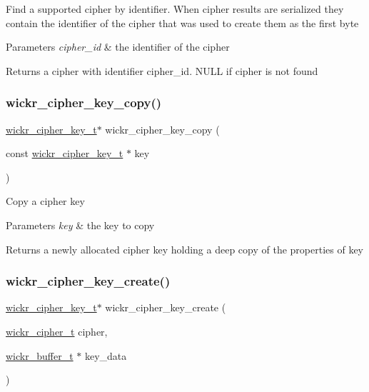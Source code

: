 Find a supported cipher by identifier. When cipher results are serialized they contain the identifier of the cipher that was used to create them as the first byte


\begin{DoxyParams}{Parameters}
{\em cipher\+\_\+id} & the identifier of the cipher \\
\hline
\end{DoxyParams}
\begin{DoxyReturn}{Returns}
a cipher with identifier \textquotesingle{}cipher\+\_\+id\textquotesingle{}. N\+U\+LL if cipher is not found 
\end{DoxyReturn}
\mbox{\label{group__wickr__cipher_gaa473bc83f82d6353aa6f4cb4e36bf4f0}} 
\subsubsection{\texorpdfstring{wickr\_cipher\_key\_copy()}{wickr\_cipher\_key\_copy()}}
{\footnotesize\ttfamily \mbox{\hyperlink{structwickr__cipher__key}{wickr\+\_\+cipher\+\_\+key\+\_\+t}}$\ast$ wickr\+\_\+cipher\+\_\+key\+\_\+copy (\begin{DoxyParamCaption}\item[{const \mbox{\hyperlink{structwickr__cipher__key}{wickr\+\_\+cipher\+\_\+key\+\_\+t}} $\ast$}]{key }\end{DoxyParamCaption})}

Copy a cipher key


\begin{DoxyParams}{Parameters}
{\em key} & the key to copy \\
\hline
\end{DoxyParams}
\begin{DoxyReturn}{Returns}
a newly allocated cipher key holding a deep copy of the properties of \textquotesingle{}key\textquotesingle{} 
\end{DoxyReturn}
\mbox{\label{group__wickr__cipher_ga73e2a916ba0ff19517e30a65a68390f0}} 
\subsubsection{\texorpdfstring{wickr\_cipher\_key\_create()}{wickr\_cipher\_key\_create()}}
{\footnotesize\ttfamily \mbox{\hyperlink{structwickr__cipher__key}{wickr\+\_\+cipher\+\_\+key\+\_\+t}}$\ast$ wickr\+\_\+cipher\+\_\+key\+\_\+create (\begin{DoxyParamCaption}\item[{\mbox{\hyperlink{structwickr__cipher}{wickr\+\_\+cipher\+\_\+t}}}]{cipher,  }\item[{\mbox{\hyperlink{structwickr__buffer}{wickr\+\_\+buffer\+\_\+t}} $\ast$}]{key\+\_\+data }\end{DoxyParamCaption})}

